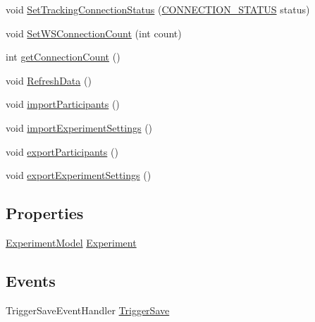 \begin{DoxyCompactItemize}
\item 
void \hyperlink{class_web_analyzer_1_1_u_i_1_1_interaction_objects_1_1_experiment_object_a2fb6e773317ff48802d4f5fda022005c}{Set\+Tracking\+Connection\+Status} (\hyperlink{class_web_analyzer_1_1_u_i_1_1_interaction_objects_1_1_experiment_object_a2875208b4f4b0ed643593152f4ec025c}{C\+O\+N\+N\+E\+C\+T\+I\+O\+N\+\_\+\+S\+T\+A\+T\+U\+S} status)
\item 
void \hyperlink{class_web_analyzer_1_1_u_i_1_1_interaction_objects_1_1_experiment_object_a4a6279a2c406c90ad9339cbf44a64d36}{Set\+W\+S\+Connection\+Count} (int count)
\item 
int \hyperlink{class_web_analyzer_1_1_u_i_1_1_interaction_objects_1_1_experiment_object_aeb82fcd6bba971c2e08d59b236ee37c9}{get\+Connection\+Count} ()
\item 
void \hyperlink{class_web_analyzer_1_1_u_i_1_1_interaction_objects_1_1_experiment_object_a11b8d543111e03266b1c22d601131376}{Refresh\+Data} ()
\item 
void \hyperlink{class_web_analyzer_1_1_u_i_1_1_interaction_objects_1_1_experiment_object_a193718a840220a11a4f4e0778813716d}{import\+Participants} ()
\item 
void \hyperlink{class_web_analyzer_1_1_u_i_1_1_interaction_objects_1_1_experiment_object_aabec73f1883a94c250de42c66dffcba0}{import\+Experiment\+Settings} ()
\item 
void \hyperlink{class_web_analyzer_1_1_u_i_1_1_interaction_objects_1_1_experiment_object_ab72d5f594fdde151438483aa71ed69fa}{export\+Participants} ()
\item 
void \hyperlink{class_web_analyzer_1_1_u_i_1_1_interaction_objects_1_1_experiment_object_afd490226e8e3dd94d51ac2d439c95ae4}{export\+Experiment\+Settings} ()
\end{DoxyCompactItemize}
\subsection*{Properties}
\begin{DoxyCompactItemize}
\item 
\hyperlink{class_web_analyzer_1_1_models_1_1_base_1_1_experiment_model}{Experiment\+Model} \hyperlink{class_web_analyzer_1_1_u_i_1_1_interaction_objects_1_1_experiment_object_a2b87e06b55663703f1017c95c19bfa29}{Experiment}
\end{DoxyCompactItemize}
\subsection*{Events}
\begin{DoxyCompactItemize}
\item 
Trigger\+Save\+Event\+Handler \hyperlink{class_web_analyzer_1_1_u_i_1_1_interaction_objects_1_1_experiment_object_a650d83ab59dbf1753939130f39bf27fa}{Trigger\+Save}
\end{DoxyCompactItemize}
